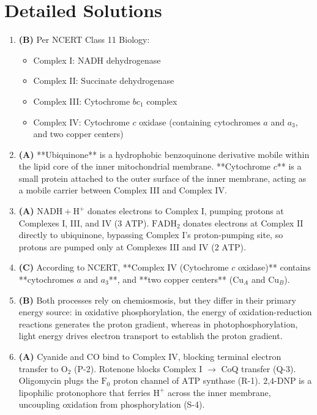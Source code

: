 \documentclass[11pt, a4paper]{article}
\begin{document}
\section*{Detailed Solutions}

\begin{enumerate}[label=\textbf{\arabic*.}]

\item \textbf{(B)} Per NCERT Class 11 Biology:
\begin{itemize}
    \item Complex I: $\text{NADH}$ dehydrogenase
    \item Complex II: Succinate dehydrogenase
    \item Complex III: Cytochrome $bc_1$ complex
    \item Complex IV: Cytochrome $c$ oxidase (containing cytochromes $a$ and $a_3$, and two copper centers)
\end{itemize}

\item \textbf{(A)} **Ubiquinone** is a hydrophobic benzoquinone derivative mobile within the lipid core of the inner mitochondrial membrane. **Cytochrome $c$** is a small protein attached to the outer surface of the inner membrane, acting as a mobile carrier between Complex III and Complex IV.

\item \textbf{(A)} $\text{NADH} + \text{H}^+$ donates electrons to Complex I, pumping protons at Complexes I, III, and IV ($3\text{ ATP}$). $\text{FADH}_2$ donates electrons at Complex II directly to ubiquinone, bypassing Complex I's proton-pumping site, so protons are pumped only at Complexes III and IV ($2\text{ ATP}$).

\item \textbf{(C)} According to NCERT, **Complex IV (Cytochrome $c$ oxidase)** contains **cytochromes $a$ and $a_3$**, and **two copper centers** ($\text{Cu}_A$ and $\text{Cu}_B$).

\item \textbf{(B)} Both processes rely on chemiosmosis, but they differ in their primary energy source: in oxidative phosphorylation, the energy of oxidation-reduction reactions generates the proton gradient, whereas in photophosphorylation, light energy drives electron transport to establish the proton gradient.

\item \textbf{(A)} Cyanide and $\text{CO}$ bind to Complex IV, blocking terminal electron transfer to $\text{O}_2$ (P-2). Rotenone blocks Complex I $\rightarrow$ CoQ transfer (Q-3). Oligomycin plugs the $\text{F}_0$ proton channel of $\text{ATP}$ synthase (R-1). $\text{2,4-DNP}$ is a lipophilic protonophore that ferries $\text{H}^+$ across the inner membrane, uncoupling oxidation from phosphorylation (S-4).


\end{enumerate}
\end{document}
